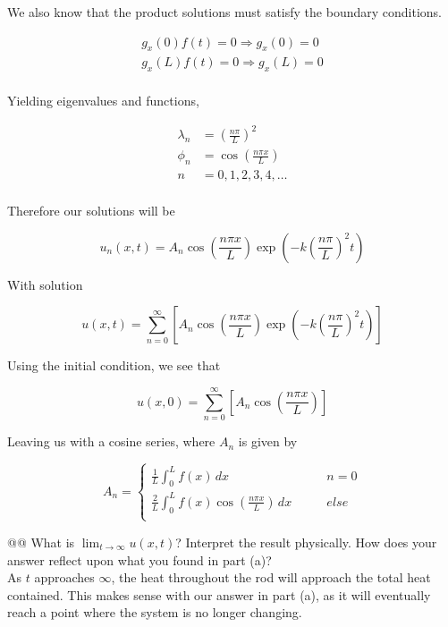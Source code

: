 \documentclass[10pt]{article}
\begin{document}
\begin{easylist}[enumerate]
    We also know that the product solutions must satisfy the boundary conditions.

    \begin{align*}
        g_x(0)f(t) = 0 \Rightarrow g_x(0) = 0\\
        g_x(L)f(t) = 0 \Rightarrow g_x(L) = 0\\
    \end{align*}

    Yielding eigenvalues and functions,

    \begin{align*}
        \lambda_n &= {\left(\frac{n\pi}{L}\right)}^2\\
        \phi_n &= \cos\left(\frac{n\pi x}{L}\right)\\
        n &= 0, 1, 2, 3, 4, \ldots\\
    \end{align*}

    Therefore our solutions will be

    \[
        u_n (x, t) = A_n \cos\left(\frac{n\pi x}{L}\right) \exp\left(-k{\left(\frac{n\pi}{L}\right)}^2 t\right)
    \]

    With solution

    \[
        u (x, t) = \sum_{n=0}^\infty \left[ A_n \cos\left(\frac{n\pi x}{L}\right) \exp\left(-k{\left(\frac{n\pi}{L}\right)}^2 t\right) \right]
    \]

    Using the initial condition, we see that

    \[
        u (x, 0) = \sum_{n=0}^\infty \left[ A_n \cos\left(\frac{n\pi x}{L}\right) \right]
    \]

    Leaving us with a cosine series, where $A_n$ is given by

    \[
        A_n = \begin{cases}
            \frac{1}{L} \int_0^L f(x) \, dx \qquad &n = 0\\
            \frac{2}{L} \int_0^L f(x) \cos\left(\frac{n\pi x}{L} \right) \, dx \qquad &else\\
        \end{cases}
    \]

    @@ What is $\lim_{t\to\infty} u(x, t)$? Interpret the result physically. How does your answer reflect upon what you
    found in part (a)?\\

    As $t$ approaches $\infty$, the heat throughout the rod will approach the total heat contained. This makes sense
    with our answer in part (a), as it will eventually reach a point where the system is no longer changing.


\end{easylist}
\end{document}
